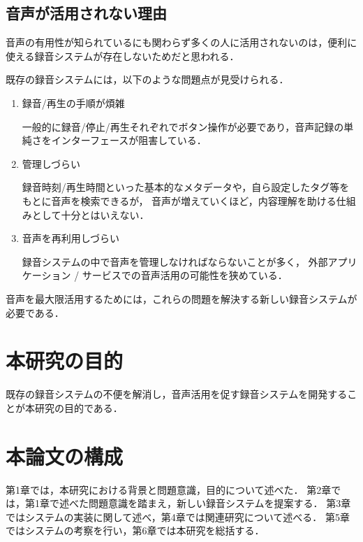 \subsection{音声が活用されない理由}

音声の有用性が知られているにも関わらず多くの人に活用されないのは，便利に使える録音システムが存在しないためだと思われる．

既存の録音システムには，以下のような問題点が見受けられる．

\begin{enumerate}
\item 録音/再生の手順が煩雑

一般的に録音/停止/再生それぞれでボタン操作が必要であり，音声記録の単純さをインターフェースが阻害している．

\item 管理しづらい

録音時刻/再生時間といった基本的なメタデータや，自ら設定したタグ等をもとに音声を検索できるが，
音声が増えていくほど，内容理解を助ける仕組みとして十分とはいえない．

\item 音声を再利用しづらい

録音システムの中で音声を管理しなければならないことが多く，
外部アプリケーション / サービスでの音声活用の可能性を狭めている．

\end{enumerate}

音声を最大限活用するためには，これらの問題を解決する新しい録音システムが必要である．

\section{本研究の目的}

既存の録音システムの不便を解消し，音声活用を促す録音システムを開発することが本研究の目的である．

\section{本論文の構成}

第1章では，本研究における背景と問題意識，目的について述べた．
第2章では，第1章で述べた問題意識を踏まえ，新しい録音システムを提案する．
第3章ではシステムの実装に関して述べ，第4章では関連研究について述べる．
第5章ではシステムの考察を行い，第6章では本研究を総括する．